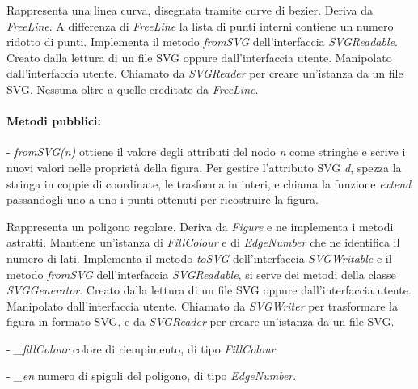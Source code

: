 Rappresenta una linea curva, disegnata tramite curve di bezier.
Deriva da \textit{FreeLine}. A differenza di \textit{FreeLine} la lista di punti interni contiene un numero ridotto di punti. Implementa il metodo \textit{fromSVG} dell'interfaccia \textit{SVGReadable}.
Creato dalla lettura di un file SVG oppure dall'interfaccia utente. Manipolato dall'interfaccia utente. Chiamato da \textit{SVGReader} per creare un'istanza da un file SVG.
Nessuna oltre a quelle ereditate da \textit{FreeLine}.
\paragraph{Metodi pubblici:}
\begin{elencopuntato}[\subsubsecindent]
\item[-] \textit{fromSVG(n)} ottiene il valore degli attributi del nodo \textit{n} come stringhe e scrive i nuovi valori nelle propriet\`a della figura. Per gestire l'attributo SVG \textit{d}, spezza la stringa in coppie di coordinate, le trasforma in interi, e chiama la funzione \textit{extend} passandogli uno a uno i punti ottenuti per ricostruire la figura. 
\end{elencopuntato}


Rappresenta un poligono regolare.
Deriva da \textit{Figure} e ne implementa i metodi astratti. Mantiene un'istanza di \textit{FillColour} e di \textit{EdgeNumber} che ne identifica il numero di lati. Implementa il metodo \textit{toSVG} dell'interfaccia \textit{SVGWritable} e il metodo \textit{fromSVG} dell'interfaccia \textit{SVGReadable}, si serve dei metodi della classe \textit{SVGGenerator}.
Creato dalla lettura di un file SVG oppure dall'interfaccia utente. Manipolato dall'interfaccia utente. Chiamato da \textit{SVGWriter} per trasformare la figura in formato SVG, e da \textit{SVGReader} per creare un'istanza da un file SVG.
\begin{elencopuntato}[\subsubsecindent]
\item[-] \textit{{\_}fillColour} colore di riempimento, di tipo \textit{FillColour}.
\item[-] \textit{{\_}en} numero di spigoli del poligono, di tipo \textit{EdgeNumber}.
\end{elencopuntato}
